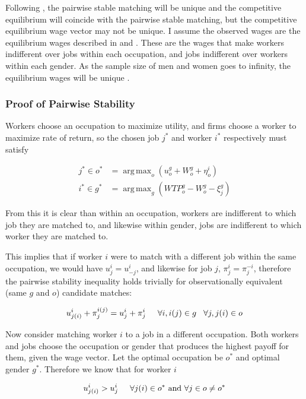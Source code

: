 \documentclass[12pt]{article}
\DeclareMathOperator*{\argmax}{arg\,max}
\begin{document}
Following , the pairwise stable matching will be unique and the competitive equilibrium will coincide with the pairwise stable matching, but the competitive equilibrium wage vector may not be unique. I assume the observed wages are the equilibrium wages described in  and . These are the wages that make workers indifferent over jobs within each occupation, and jobs indifferent over workers within each gender. As the sample size of men and women goes to infinity, the equilibrium wages will be unique \cite{Galichon2015}.

\subsubsection{Proof of Pairwise Stability}\label{sec.Stability}

Workers choose an occupation to maximize utility, and firms choose a worker to maximize rate of return, so the chosen job $j^*$ and worker $i^*$ respectively must satisfy

\begin{align*}
j^* \in o^* &= \argmax_o ( u^{g}_o + W^g_o   + \eta^i_o ) \\
i^* \in g^* &= \argmax_g (WTP^g_o -  W^g_o -\xi^g_j)
\end{align*}

From this it is clear than within an occupation, workers are indifferent to which job they are matched to, and likewise within gender, jobs are indifferent to which worker they are matched to.

This implies that if worker $i$ were to match with a different job within the same occupation, we would have $u^{i}_j =u^{i}_{-j}$, and likewise for job $j$, $\pi^{i}_j = \pi^{-i}_j $, therefore the pairwise stability inequality holds trivially for observationally equivalent (same $g$ and $o$) candidate matches:

$$u^{i}_{j(i)}+ \pi^{i(j)}_j = u^{i}_{j} + \pi^{i}_j \hspace{5mm} \forall i,i(j) \in g \hspace{3mm} \forall j,j(i) \in o$$

Now consider matching worker $i$ to a job in a different occupation. Both workers and jobs choose the occupation or gender that produces the highest payoff for them, given the wage vector. Let the optimal occupation be $o^*$ and optimal gender $g^*$. Therefore we know that for worker $i$

$$u^{i}_{j(i)} > u^{i}_{j} \hspace{5mm} \forall j(i) \in o^* \text{  and  } \forall j \in o \neq o^*$$
\end{document}
